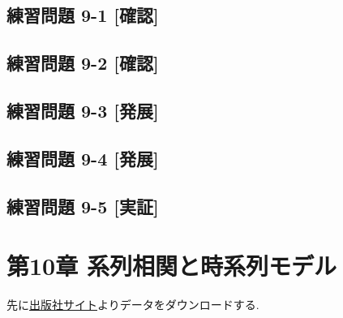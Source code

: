 \documentclass[
]{book}
\begin{document}
\hypertarget{ux7df4ux7fd2ux554fux984c-9-1-ux78baux8a8d}{%
\section*{練習問題 9-1 {[}確認{]}}\label{ux7df4ux7fd2ux554fux984c-9-1-ux78baux8a8d}}

\hypertarget{ux7df4ux7fd2ux554fux984c-9-2-ux78baux8a8d}{%
\section*{練習問題 9-2 {[}確認{]}}\label{ux7df4ux7fd2ux554fux984c-9-2-ux78baux8a8d}}

\hypertarget{ux7df4ux7fd2ux554fux984c-9-3-ux767aux5c55}{%
\section*{練習問題 9-3 {[}発展{]}}\label{ux7df4ux7fd2ux554fux984c-9-3-ux767aux5c55}}

\hypertarget{ux7df4ux7fd2ux554fux984c-9-4-ux767aux5c55}{%
\section*{練習問題 9-4 {[}発展{]}}\label{ux7df4ux7fd2ux554fux984c-9-4-ux767aux5c55}}

\hypertarget{ux7df4ux7fd2ux554fux984c-9-5-ux5b9fux8a3c}{%
\section*{練習問題 9-5 {[}実証{]}}\label{ux7df4ux7fd2ux554fux984c-9-5-ux5b9fux8a3c}}

\hypertarget{ch10}{%
\chapter*{第10章 系列相関と時系列モデル}\label{ch10}}

先に\href{https://www.yuhikaku.co.jp/books/detail/9784641053854}{出版社サイト}よりデータをダウンロードする.
\end{document}
